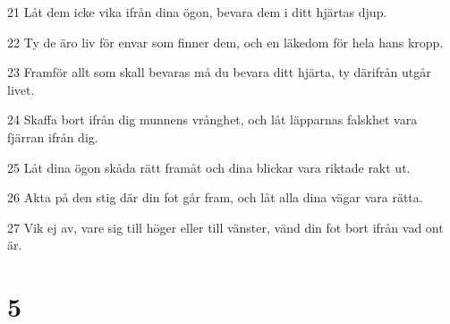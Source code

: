 \par 21 Låt dem icke vika ifrån dina ögon, bevara dem i ditt hjärtas djup.
\par 22 Ty de äro liv för envar som finner dem, och en läkedom för hela hans kropp.
\par 23 Framför allt som skall bevaras må du bevara ditt hjärta, ty därifrån utgår livet.
\par 24 Skaffa bort ifrån dig munnens vrånghet, och låt läpparnas falskhet vara fjärran ifrån dig.
\par 25 Låt dina ögon skåda rätt framåt och dina blickar vara riktade rakt ut.
\par 26 Akta på den stig där din fot går fram, och låt alla dina vägar vara rätta.
\par 27 Vik ej av, vare sig till höger eller till vänster, vänd din fot bort ifrån vad ont är.

\chapter{5}

